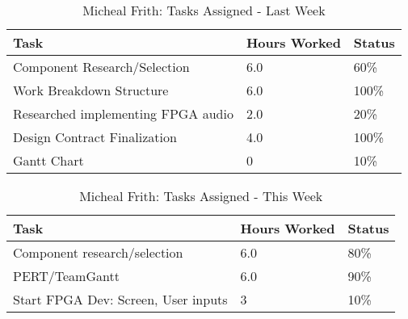 \documentclass[12pt,compsoc]{IEEEtran}
\begin{document}
    \begin{table}[ht]
		\renewcommand{\arraystretch}{1.3}
		\caption{Micheal Frith: Tasks Assigned - Last Week}
		
		\label{Summary of Micheal Frith's activities: last week}
		
		\centering
		\begin{tabular}{p{5.5cm}|p{1cm}|p{1cm}}
		\hline
		\bfseries 	Task		 							& \bfseries Hours Worked	& \bfseries Status	\\
		\hline\hline
					Component Research/Selection			& 6.0 						& 60\%	 			\\    		
					Work Breakdown Structure                & 6.0 		                & 100\%   			\\   
					Researched implementing FPGA audio 		& 2.0						& 20\% 				\\
					Design Contract Finalization			& 4.0 						& 100\%   			\\  
					Gantt Chart								& 0 						& 10\%    			\\ 
							\hline
		\end{tabular}
	\end{table}

	\begin{table}[ht]
	\renewcommand{\arraystretch}{1.3}
		\caption{Micheal Frith: Tasks Assigned - This Week}
		
		\label{Summary of Micheal Frith's activities: this week}
		
		\centering
		\begin{tabular}{p{5.5cm}|p{1cm}|p{1cm}}
		\hline
		\bfseries 	Task		 							& \bfseries Hours Worked	& \bfseries Status	\\
		\hline\hline
					Component research/selection			& 6.0						& 80\%				\\
					PERT/TeamGantt							& 6.0						& 90\%				\\
                    Start FPGA Dev: Screen, User inputs     & 3                         & 10\%%
		\hline
		\end{tabular}
	\end{table}

\end{document}
